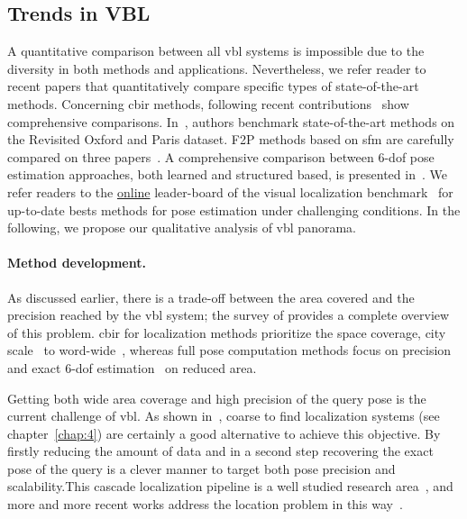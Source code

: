 	\subsection{Trends in VBL}
		\label{subsec:qualitative_comparison}
    	
		A quantitative comparison between all \ac{vbl} systems is impossible due to the diversity in both methods and applications. Nevertheless, we refer reader to recent papers that quantitatively compare specific types of state-of-the-art methods. Concerning \ac{cbir} methods, following recent contributions~\citep{Radenovic2016,Gordo2016} show comprehensive comparisons. In~\citep{Radenovic2018}, authors benchmark state-of-the-art methods on the Revisited Oxford and Paris dataset. F2P methods based on \ac{sfm} are carefully compared on three papers~\citep{Feng2016a,Sattler2016a,Svarm2016}. A comprehensive comparison between 6-\ac{dof} pose estimation approaches, both learned and structured based, is presented in~\citep{Sattler2019}. We refer readers to the \href{https://www.visuallocalization.net/benchmark/}{online} leader-board of the visual localization benchmark~\citep{Sattler2018} for up-to-date bests methods for pose estimation under challenging conditions. In the following, we propose our qualitative analysis of \ac{vbl} panorama. 
        
        \paragraph{Method development.}
        	As discussed earlier, there is a trade-off between the area covered and the precision reached by the \ac{vbl} system; the survey of \citet{Brejcha2017} provides a complete overview of this problem. \ac{cbir} for localization methods prioritize the space coverage, city scale~\citep{Gordo2016} to word-wide~\citep{Vo2017}, whereas full pose computation methods focus on precision and exact 6-\ac{dof} estimation~\citep{Feng2016a} on reduced area. 

	        Getting both wide area coverage and high precision of the query pose is the current challenge of \ac{vbl}. As shown in~\citep{Sattler2017}, coarse to find localization systems (see chapter~\ref{chap:4}) are certainly a good alternative to achieve this objective. By firstly reducing the amount of data and in a second step recovering the exact pose of the query is a clever manner to target both pose precision and scalability.This cascade localization pipeline is a well studied research area~\citep{Rubio2015,Azzi2016,Song2016,Meng2016,Sattler2017}, and more and more recent works address the location problem in this way~\citep{Sarlin2018a,Sarlin2018,Germain2019}.
     
